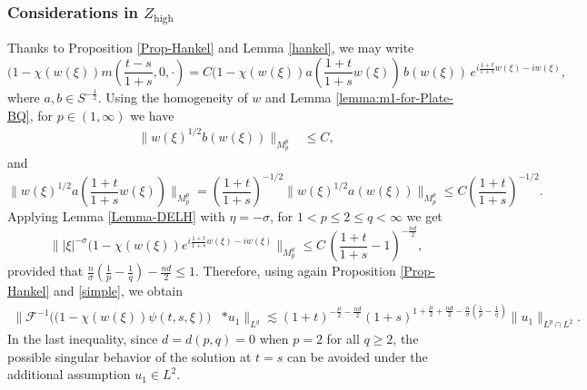\documentclass[10pt]{article}
\newcommand{\<}{\langle}
\renewcommand{\>}{\rangle}
\numberwithin{equation}{section}
\begin{document}
\subsubsection{Considerations in $Z_{\text{high}}$}
Thanks to Proposition \ref{Prop-Hankel} and Lemma \ref{hankel}, we may write
\[ (1-\chi(w(\xi))m\left(\frac{t-s}{1+s}, 0, \cdot\right)=C(1-\chi(w(\xi)) a\left(\frac{1+t}{1+s}w(\xi)\right)\,b(w(\xi))\, e^{i\frac{1+t}{1+s}w(\xi)-iw(\xi)} ,\]
where $a, b\in S^{-\frac12}$.
Using  the homogeneity of  $w$ and Lemma \ref{lemma:m1-for-Plate-BQ}, for $p\in (1, \infty)$ we have
\begin{align*}
\|w(\xi)^{1/2} b(w(\xi))\|_{M_p^p} & \leq C ,
\end{align*}
and
\[ \big\| w(\xi)^{1/2} a\left(\frac{1+t}{1+s}w(\xi)\right) \big\|_{M_p^p}=\left(\frac{1+t}{1+s}\right)^{-1/2}\| w(\xi)^{1/2} a(w(\xi)) \|_{M_p^p} \leq C \left(\frac{1+t}{1+s}\right)^{-1/2}. \]
Applying Lemma \ref{Lemma-DELH} with  $\eta=-\sigma$,  for $1< p\leq 2\leq q<\infty$ we get
\[ \big\| |\xi|^{-\sigma}(1-\chi(w(\xi)) e^{i\frac{1+t}{1+s}w(\xi)-iw(\xi)}\big\|_{M_p^q} \leq
C\,\left(\frac{1+t}{1+s}-1\right)^{-\frac{nd}2},
\]
provided that $\frac{n}{\sigma}\left(\frac1p-\frac1q\right)- \frac{nd}{2}\leq 1$. Therefore, using again Proposition \ref{Prop-Hankel} and \eqref{simple},  we obtain
\begin{align*}
\big\|\mathcal{F}^{-1}\big( (1-\chi(w(\xi))\psi(t,s,\xi) \big)&\ast u_1\big\|_{L^q} \lesssim (1+t)^{-\frac{\mu}2-\frac{nd}2}
(1+s)^{1+\frac{\mu}2 +\frac{nd}2-\frac{n}{\sigma}\left(\frac1p-\frac1q\right)} \|u_1\|_{L^p\cap L^2}.
\end{align*}
In the last inequality, since $d=d(p,q)=0$ when $p=2$ for all $q\geq 2$, the possible singular behavior of the solution at $t=s$ can be avoided under the additional assumption $u_1\in L^2$.
%
\end{document}
